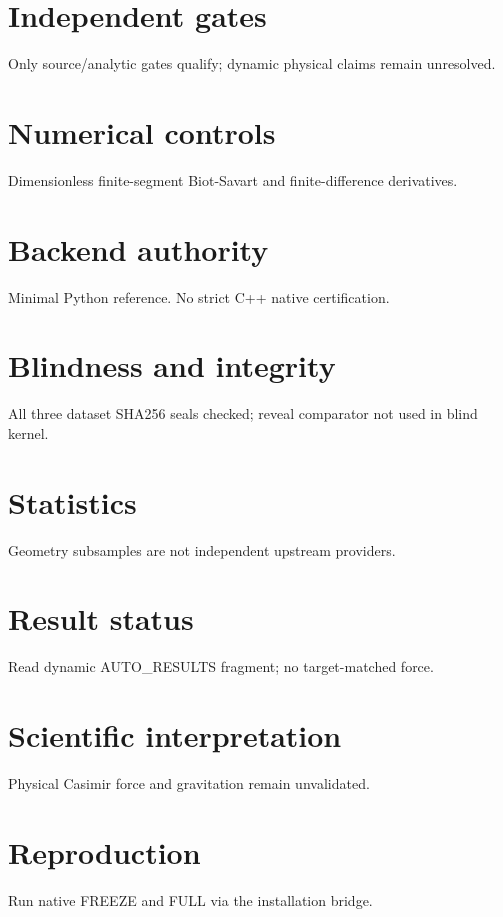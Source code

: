 \documentclass[10pt,a4paper]{article}
\begin{document}
\section{Independent gates}
Only source/analytic gates qualify; dynamic physical claims remain unresolved.
\section{Numerical controls}
Dimensionless finite-segment Biot-Savart and finite-difference derivatives.
\section{Backend authority}
Minimal Python reference. No strict C++ native certification.
\section{Blindness and integrity}
All three dataset SHA256 seals checked; reveal comparator not used in blind kernel.
\section{Statistics}
Geometry subsamples are not independent upstream providers.
\section{Result status}
Read dynamic AUTO\_RESULTS fragment; no target-matched force.

\section{Scientific interpretation}
Physical Casimir force and gravitation remain unvalidated.
\section{Reproduction}
Run native FREEZE and FULL via the installation bridge.
\end{document}
